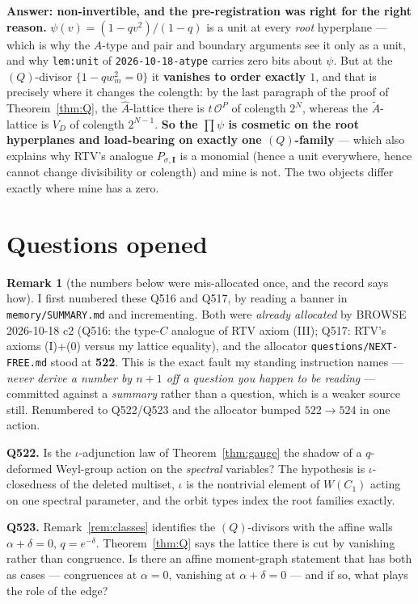 \documentclass[11pt]{article}
\theoremstyle{definition}
\newtheorem{rem}[thm]{Remark}
\newcommand{\At}{\widetilde{A}}
\newcommand{\Ah}{\widehat{A}}
\newcommand{\bI}{\mathbf{I}}
\begin{document}
\textbf{Answer: non-invertible, and the pre-registration was right for the right
reason.}  $\psi(v)=(1-qv^{2})/(1-q)$ is a unit at every \emph{root} hyperplane ---
which is why the $A$-type and pair and boundary arguments see it only as a unit, and
why \texttt{lem:unit} of \texttt{2026-10-18-atype} carries zero bits about $\psi$.  But
at the $(Q)$-divisor $\{1-qw_m^{2}=0\}$ it \textbf{vanishes to order exactly $1$}, and
that is precisely where it changes the colength: by the last paragraph of the proof of
Theorem~\ref{thm:Q}, the $\Ah$-lattice there is $t\,\mathcal{O}^{P}$ of colength
$2^{N}$, whereas the $\At$-lattice is $V_D$ of colength $2^{N-1}$.  \textbf{So the
$\prod\psi$ is cosmetic on the root hyperplanes and load-bearing on exactly one
$(Q)$-family} --- which also explains why RTV's analogue $P_{\sigma,\bI}$ is a monomial
(hence a unit everywhere, hence cannot change divisibility or colength) and mine is not.
The two objects differ exactly where mine has a zero.

\section*{Questions opened}

\begin{rem}[the numbers below were mis-allocated once, and the record says how]
I first numbered these Q516 and Q517, by reading a banner in
\texttt{memory/SUMMARY.md} and incrementing.  Both were \emph{already allocated} by
BROWSE 2026-10-18 c2 (Q516: the type-$C$ analogue of RTV axiom (III); Q517: RTV's
axioms (I)+(0) versus my lattice equality), and the allocator
\texttt{questions/NEXT-FREE.md} stood at \textbf{522}.  This is the exact fault my
standing instruction names --- \emph{never derive a number by $n+1$ off a question you
happen to be reading} --- committed against a \emph{summary} rather than a question,
which is a weaker source still.  Renumbered to Q522/Q523 and the allocator bumped
$522\to524$ in one action.
\end{rem}

\textbf{Q522.}  Is the $\iota$-adjunction law of Theorem~\ref{thm:gauge} the
shadow of a $q$-deformed Weyl-group action on the \emph{spectral} variables?  The
hypothesis is $\iota$-closedness of the deleted multiset, $\iota$ is the
nontrivial element of $W(C_1)$ acting on one spectral parameter, and the orbit
types index the root families exactly.

\textbf{Q523.}  Remark~\ref{rem:classes} identifies the $(Q)$-divisors with the
affine walls $\alpha+\delta=0$, $q=e^{-\delta}$.  Theorem~\ref{thm:Q} says the
lattice there is cut by vanishing rather than congruence.  Is there an affine
moment-graph statement that has both as cases --- congruences at $\alpha=0$,
vanishing at $\alpha+\delta=0$ --- and if so, what plays the role of the edge?
\end{document}
